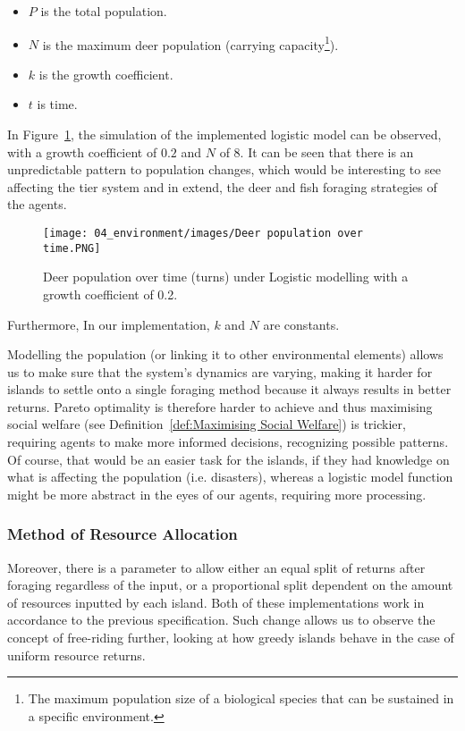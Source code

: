 \begin{itemize}
    \item $P$ is the total population. 
    \item $N$ is the maximum deer population (carrying capacity\footnote{The maximum population size of a biological species that can be sustained in a specific environment.}).
    \item $k$ is the growth coefficient.
    \item $t$ is time.
\end{itemize}

In Figure~\ref{fig:Deer population over time}, the simulation of the implemented logistic model can be observed, with a growth coefficient of $0.2$ and $N$ of 8. It can be seen that there is an unpredictable pattern to population changes, which would be interesting to see affecting the tier system and in extend, the deer and fish foraging strategies of the agents.

\begin{figure}[!htb]
    \centering
    \texttt{[image: 04\_environment/images/Deer population over time.PNG]}
    \caption{Deer population over time (turns) under Logistic modelling with a growth coefficient of 0.2.}
    \label{fig:Deer population over time}
\end{figure}

Furthermore, In our implementation, $k$ and $N$ are constants. 

Modelling the population (or linking it to other environmental elements) allows us to make sure that the system’s dynamics are varying, making it harder for islands to settle onto a single foraging method because it always results in better returns. Pareto optimality is therefore harder to achieve and thus maximising social welfare (see Definition~\ref{def:Maximising Social Welfare}) is trickier, requiring agents to make more informed decisions, recognizing possible patterns. Of course, that would be an easier task for the islands, if they had knowledge on what is affecting the population (i.e. disasters), whereas a logistic model function might be more abstract in the eyes of our agents, requiring more processing. 

\subsubsection{Method of Resource Allocation}

Moreover, there is a parameter to allow either an equal split of returns after foraging regardless of the input, or a proportional split dependent on the amount of resources inputted by each island. Both of these implementations work in accordance to the previous specification. Such change allows us to observe the concept of free-riding further, looking at how greedy islands behave in the case of uniform resource returns.

